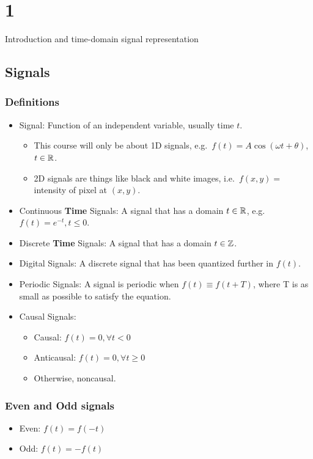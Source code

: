 \documentclass[Main.tex]{subfiles}
\begin{document}
\chapter{1}{Introduction and time-domain signal representation}

\section{Signals}
\subsection{Definitions}
\begin{definitions}
\begin{itemize}
    \item Signal: Function of an independent variable, usually time $t$.
    \begin{itemize}
        \item This course will only be about 1D signals, e.g.\ $f(t) = A \cos(\omega t + \theta )$, $t \in \mathbb{R}$.
        \item 2D signals are things like black and white images, i.e.\ $f(x,y)=$ intensity of pixel at $(x, y)$.
    \end{itemize}
    \item Continuous \textbf{Time} Signals: A signal that has a domain $t \in \mathbb{R}$, e.g.\ $f(t)= e^{-t}, t \leq 0$.
    \item Discrete \textbf{Time} Signals: A signal that has a domain $t \in \mathbb{Z}$.
    \item Digital Signals: A discrete signal that has been quantized further in $f(t)$.
    \item Periodic Signals: A signal is periodic when $f(t) \equiv f(t+T)$, where T is as small as possible to satisfy the equation.
    \item Causal Signals:
    \begin{itemize}
        \item Causal: $f(t) = 0, \forall t < 0$
        \item Anticausal: $f(t) = 0, \forall t \geq 0$
        \item Otherwise, noncausal.
    \end{itemize}
\end{itemize}
\end{definitions}
\subsection{Even and Odd signals}
\begin{itemize}
    \item Even: $f(t) = f(-t)$
    \item Odd: $f(t) = -f(t)$
\end{itemize}
\end{document}
